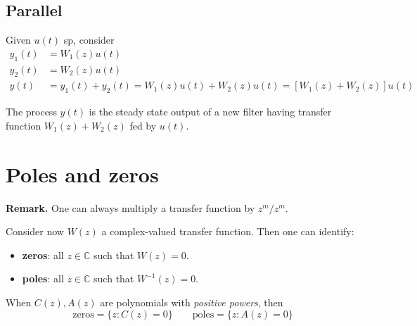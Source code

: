 \subsection{Parallel}
Given $u(t)$ \gls{sp}, consider
\begin{align*}
	y_{1}(t)&=W_{1}(z)u(t)\\
	y_{2}(t)&=W_{2}(z)u(t)\\
	y(t)&=y_{1}(t)+y_{2}(t)=W_{1}(z)u(t)+W_{2}(z)u(t)=[W_{1}(z)+W_{2}(z)]u(t)
\end{align*}
\begin{figure}[htpb]
	\centering
\end{figure}
\FloatBarrier
\begin{theorem}
	The process $y(t)$ is the steady state output of a new filter having transfer function $W_{1}(z)+W_{2}(z)$ fed by $u(t)$.
\end{theorem}

\section{Poles and zeros}

\textbf{Remark.}
One can always multiply a transfer function by $z^{m}/z^{m}$.

Consider now $W(z)$ a complex-valued transfer function. Then one can identify:
\begin{itemize}
	\item \textbf{zeros}: all $z\in \mathbb{C}$ such that $W(z)=0$.
	\item \textbf{poles}: all $z\in \mathbb{C}$ such that $W^{-1} (z)=0$.
\end{itemize}
When $C(z),A(z)$ are polynomials with \emph{positive powers}, then
\[
	\text{zeros}=\{z:C(z)=0\} \qquad \text{poles}=\{z:A(z)=0\}
\]

